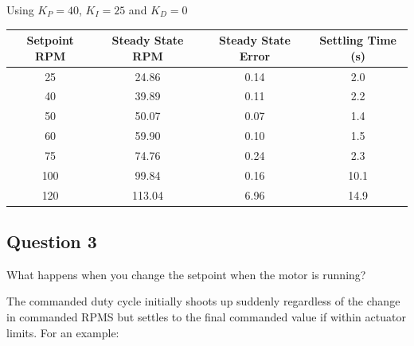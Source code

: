 \documentclass[12pt]{article}
\begin{document}
Using $K_P = 40$, $K_I = 25$ and $K_D=0$

\begin{table}[h]
    \centering
    \begin{tabular}{|c|c|c|c|}
        \hline
        \textbf{Setpoint RPM} & \textbf{Steady State RPM} & \textbf{Steady State Error} & \textbf{Settling Time (s)} \\
        \hline\hline
        25   & 24.86 & 0.14 & 2.0  \\
        \hline
        40   & 39.89 & 0.11 & 2.2  \\
        \hline
        50   & 50.07 & 0.07 & 1.4  \\
        \hline
        60   & 59.90 & 0.10 & 1.5  \\
        \hline
        75   & 74.76 & 0.24 & 2.3  \\
        \hline
        100  & 99.84 & 0.16 & 10.1 \\
        \hline
        120  & 113.04 & 6.96 & 14.9 \\
        \hline
    \end{tabular}
    \label{tab:steady_state_metrics}
\end{table}

\subsection{Question 3}
What happens when you change the setpoint when the motor is running?

The commanded duty cycle initially shoots up suddenly regardless of the change in commanded RPMS but settles to the final commanded value if within actuator limits. For an example:
\end{document}
